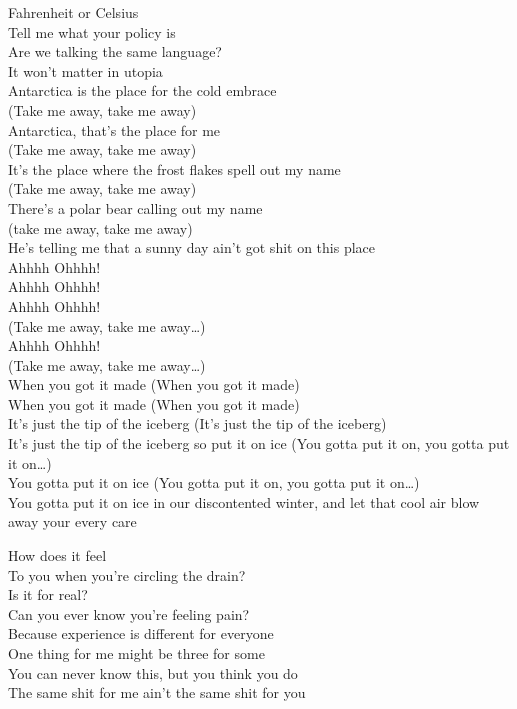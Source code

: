 Fahrenheit or Celsius \\
Tell me what your policy is \\
Are we talking the same language? \\
It won't matter in utopia \\
Antarctica is the place for the cold embrace \\

(Take me away, take me away) \\
Antarctica, that's the place for me \\
(Take me away, take me away) \\
It's the place where the frost flakes spell out my name \\
(Take me away, take me away) \\
There's a polar bear calling out my name \\
(take me away, take me away) \\
He's telling me that a sunny day ain't got shit on this place \\

Ahhhh Ohhhh! \\
Ahhhh Ohhhh! \\
Ahhhh Ohhhh! \\
(Take me away, take me away…) \\
Ahhhh Ohhhh! \\
(Take me away, take me away…) \\

When you got it made (When you got it made) \\
When you got it made (When you got it made) \\
It's just the tip of the iceberg (It's just the tip of the iceberg) \\
It's just the tip of the iceberg so put it on ice (You gotta put it on, you gotta put it on…) \\
You gotta put it on ice (You gotta put it on, you gotta put it on…) \\
You gotta put it on ice in our discontented winter, and let that cool air blow away your every care \\



How does it feel \\
To you when you're circling the drain? \\
Is it for real? \\
Can you ever know you're feeling pain? \\
Because experience is different for everyone \\
One thing for me might be three for some \\
You can never know this, but you think you do \\
The same shit for me ain't the same shit for you \\

